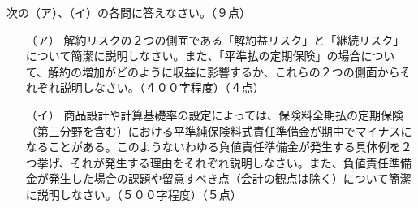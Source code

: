 \documentclass[report,gutter=10mm,fore-edge=10mm,uplatex,dvipdfmx]{jlreq}
\begin{document}
次の（ア）、（イ）の各問に答えなさい。（９点）
\begin{itemize}
 \item [（ア）]解約リスクの２つの側面である「解約益リスク」と「継続リスク」について簡潔に説明しなさい。また、「平準払の定期保険」の場合について、解約の増加がどのように収益に影響するか、これらの２つの側面からそれぞれ説明しなさい。（４００字程度）（４点）
 \item [（イ）]商品設計や計算基礎率の設定によっては、保険料全期払の定期保険（第三分野を含む）における平準純保険料式責任準備金が期中でマイナスになることがある。このようないわゆる負値責任準備金が発生する具体例を２つ挙げ、それが発生する理由をそれぞれ説明しなさい。また、負値責任準備金が発生した場合の課題や留意すべき点（会計の観点は除く）について簡潔に説明しなさい。（５００字程度）（５点）
\end{itemize}
\end{document}
